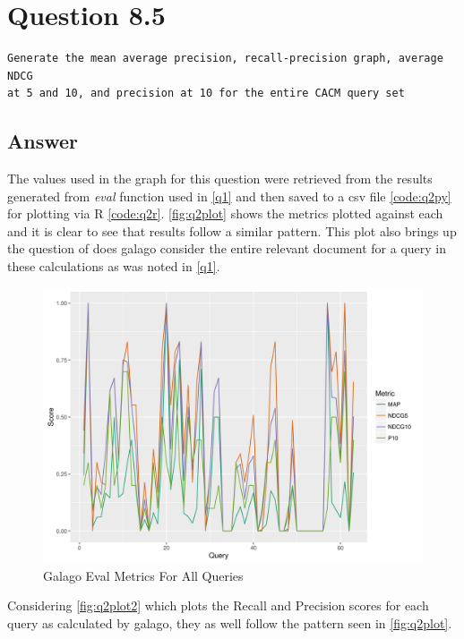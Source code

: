 \documentclass[11pt]{article}
\begin{document}
\section{Question 8.5} \label{q2}
\begin{verbatim}
Generate the mean average precision, recall-precision graph, average NDCG
at 5 and 10, and precision at 10 for the entire CACM query set
\end{verbatim}
\subsection{Answer} 
The values used in the graph for this question were retrieved from the results generated from \textit{eval} function used in \autoref{q1} and then saved to a csv file \autoref{code:q2py} for plotting via R \autoref{code:q2r}.  \autoref{fig:q2plot} shows the metrics plotted against each and it is clear to see that results follow a similar pattern. This plot also brings up the question of does galago consider the entire relevant document for a query in these calculations as was noted in \autoref{q1}. 
\begin{figure}[H]
\centering
\includegraphics[scale=0.9]{q2_plot.png}
\caption{Galago Eval Metrics For All Queries}
\label{fig:q2plot}
\end{figure}
Considering \autoref{fig:q2plot2} which plots the Recall and Precision scores for each query as calculated by galago, they as well follow the pattern seen in \autoref{fig:q2plot}.
\end{document}
